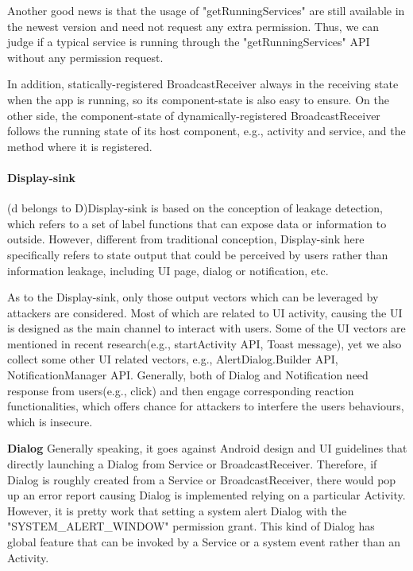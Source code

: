 \documentclass{sig-alternate-05-2015}
\begin{document}
Another good news is that the usage of  "getRunningServices" are still available in the newest version and need not request any extra permission. Thus, we can judge if a typical service is running through the "getRunningServices" API without any permission request. 

In addition, statically-registered BroadcastReceiver always in the receiving state when the app is running, so its component-state is also easy to ensure. On the other side, the component-state of dynamically-registered BroadcastReceiver follows the running state of its host component, e.g., activity and service, and the method where it is registered.


\paragraph{Display-sink}

(d belongs to D)Display-sink is based on the conception of leakage detection, which refers to a set of label functions that can expose data or information to outside. However, different from traditional conception, Display-sink here specifically refers to state output that could be perceived by users rather than information leakage, including UI page, dialog or notification, etc.

As to the Display-sink, only those output vectors which can be leveraged by attackers are considered. Most of which are related to UI activity, causing the UI is designed as the main channel to interact with users. Some of the UI vectors are mentioned in recent research\cite{bianchi2015app}(e.g., startActivity API, Toast message), yet we also collect some other UI related vectors, e.g., AlertDialog.Builder API, NotificationManager API. Generally, both of Dialog and Notification need response from users(e.g., click) and then engage corresponding reaction functionalities, which offers chance for attackers to interfere the users behaviours, which is insecure.

\textbf{Dialog}
Generally speaking, it goes against Android design and UI guidelines that directly launching a Dialog from Service or BroadcastReceiver. Therefore, if Dialog is roughly created from a Service or BroadcastReceiver, there would pop up an error report causing Dialog is implemented relying on a particular Activity. However, it is pretty work that setting a system alert Dialog with the "SYSTEM\_ALERT\_WINDOW" permission grant. This kind of Dialog has global feature that can be invoked by a Service or a system event rather than an Activity. 
\end{document}
